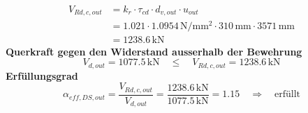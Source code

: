 \documentclass[11pt,a4paper]{article}
\begin{document}
\begin{equation*}
\begin{aligned}
  V_{Rd,c,out} &= k_r \cdot \tau_{cd} \cdot d_{v,out} \cdot u_{out} \\
  &= 1.021 \cdot 1.0954\,\mathrm{N}/\mathrm{mm}^{2} \cdot 310\,\mathrm{mm} \cdot 3571\,\mathrm{mm} \\
  &= 1238.6\,\mathrm{kN}
\end{aligned}
\end{equation*}
\noindent\textbf{Querkraft gegen den Widerstand ausserhalb der Bewehrung}
\begin{equation*}
V_{d,out} = 1077.5\,\mathrm{kN} \quad \le \quad V_{Rd,c,out} = 1238.6\,\mathrm{kN}
\end{equation*}
\noindent\textbf{Erfüllungsgrad}
\begin{equation*}
\alpha_{eff,DS,out} = \frac{V_{Rd,c,out}}{V_{d,out}} = \frac{1238.6\,\mathrm{kN}}{1077.5\,\mathrm{kN}} = 1.15 \quad \Rightarrow \quad \text{erfüllt}
\end{equation*}
\end{document}
